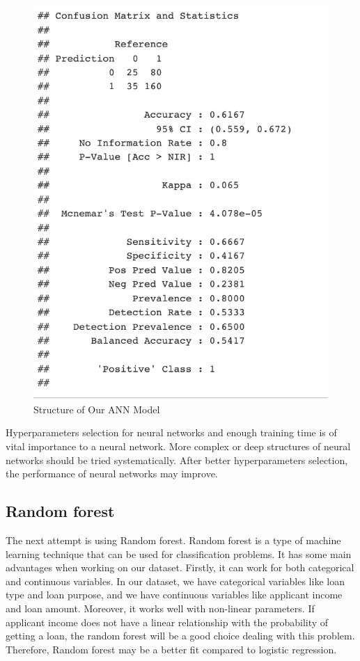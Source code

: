 \documentclass{jpp}
\begin{document}
\begin{figure}
  \centering
  \includegraphics[width=.9\linewidth]{nn_results.png}  
  \caption{Structure of Our ANN Model}
\label{nn_results}
\end{figure}

Hyperparameters selection for neural networks and enough training time is of vital importance to a neural network. More complex or deep structures of neural networks should be tried systematically. After better hyperparameters selection, the performance of neural networks may improve. 

\subsection{Random forest}

The next attempt is using Random forest. Random forest is a type of machine learning technique that can be used for classification problems. It has some main advantages when working on our dataset. Firstly, it can work for both categorical and continuous variables. In our dataset, we have categorical variables like loan type and loan purpose, and we have continuous variables like applicant income and loan amount. Moreover, it works well with non-linear parameters. If applicant income does not have a linear relationship with the probability of getting a loan, the random forest will be a good choice dealing with this problem. Therefore, Random forest may be a better fit compared to logistic regression.
\end{document}
